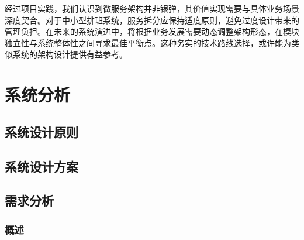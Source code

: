 \documentclass{ctexart}
\begin{document}
经过项目实践，我们认识到微服务架构并非银弹，其价值实现需要与具体业务场景深度契合。对于中小型排班系统，服务拆分应保持适度原则，避免过度设计带来的管理负担。在未来的系统演进中，将根据业务发展需要动态调整架构形态，在模块独立性与系统整体性之间寻求最佳平衡点。这种务实的技术路线选择，或许能为类似系统的架构设计提供有益参考。

\section{系统分析}
\subsection{系统设计原则}
\subsection{系统设计方案}
\subsection{需求分析}
\subsubsection{概述}
\end{document}
